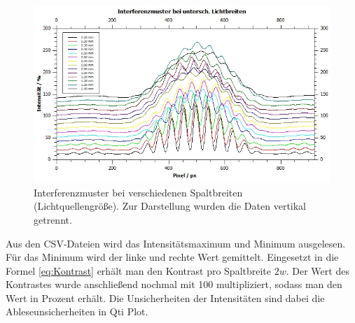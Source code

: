 \documentclass[12pt,a4paper,twoside]{article}
\begin{document}
\begin{figure}[H]
    \centering
    \includegraphics[width=0.6\linewidth]{nudes/aufgabe 1 plot.jpg}
    \caption{Interferenzmuster bei verschiedenen Spaltbreiten (Lichtquellengröße). Zur Darstellung wurden die Daten vertikal getrennt. }
    \label{fig:aufgabe 1 plot}
\end{figure}

\noindent
Aus den CSV-Dateien wird das Intensitätsmaximum und Minimum ausgelesen. Für das Minimum wird der linke und rechte Wert gemittelt. Eingesetzt in die Formel \ref{eq:Kontrast} erhält man den Kontrast pro Spaltbreite $2w$. 
Der Wert des Kontrastes wurde anschließend nochmal mit 100 multipliziert, sodass man den Wert in Prozent erhält. 
Die Unsicherheiten der Intensitäten sind dabei die Ableseunsicherheiten in Qti Plot. 
\end{document}
